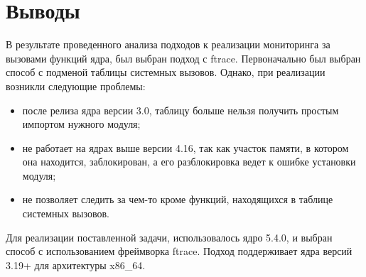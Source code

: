 \begin{table}[H]
	\caption{Cравнительный анализ методов перехвата функций ядра Linux}
	\label{t1}
	\centering
\end{table}

\section{Выводы}
В результате проведенного анализа подходов к реализации мониторинга за вызовами функций ядра, был выбран подход с ftrace. Первоначально был выбран способ с подменой таблицы системных вызовов. Однако, при реализации возникли следующие проблемы:
\begin{itemize}
	\item после релиза ядра версии 3.0, таблицу больше нельзя получить простым импортом нужного модуля;
	\item не работает на ядрах выше версии 4.16, так как участок памяти, в котором она находится, заблокирован, а его разблокировка ведет к ошибке установки модуля;
	\item не позволяет следить за чем-то кроме функций, находящихся в таблице системных вызовов.
\end{itemize}

Для реализации поставленной задачи, использовалось ядро 5.4.0, и выбран способ с использованием фреймворка ftrace. Подход поддерживает ядра версий 3.19+ для архитектуры x86\_64.

